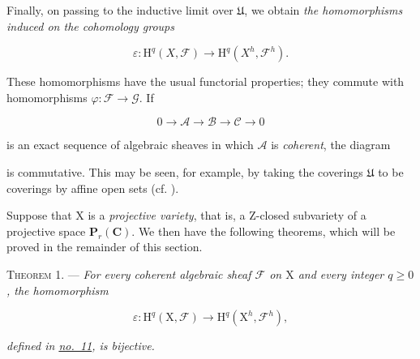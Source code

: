 Finally, on passing to the inductive limit over $\mathfrak{U}$, we obtain \emph{the homomorphisms induced on the cohomology groups}

\begin{equation*}
\varepsilon:\mathrm{H}^q(X,\mathcal{F})
\longrightarrow
\mathrm{H}^q(X^h,\mathcal{F}^h).
\end{equation*}

These homomorphisms have the usual functorial properties; they commute with homomorphisms $\varphi:\mathcal{F}\to\mathcal{G}$. If

\begin{equation*}
0\longrightarrow\mathcal{A}\longrightarrow\mathcal{B}\longrightarrow\mathcal{C}\longrightarrow0
\end{equation*}

is an exact sequence of algebraic sheaves in which $\mathcal{A}$ is \emph{coherent}, the diagram

\begin{center}
\end{center}

is commutative. This may be seen, for example, by taking the coverings $\mathfrak{U}$ to be coverings by affine open sets (cf. ).


Suppose that $\mathrm{X}$ is a \emph{projective variety}, that is, a Z-closed subvariety of a projective space $\mathbf{P}_r(\mathbf{C})$. We then have the following theorems, which will be proved in the remainder of this section.

\textsc{Theorem 1}. --- \emph{For every coherent algebraic sheaf $\mathcal{F}$ on $\mathrm{X}$ and every integer $q\geqslant0$, the homomorphism}

\begin{equation*}
\varepsilon:\mathrm{H}^q(\mathrm{X},\mathcal{F})
\longrightarrow
\mathrm{H}^q(\mathrm{X}^h,\mathcal{F}^h),
\end{equation*}

\emph{defined in \hyperref[gaga:no:11]{no.~11}, is bijective.}

